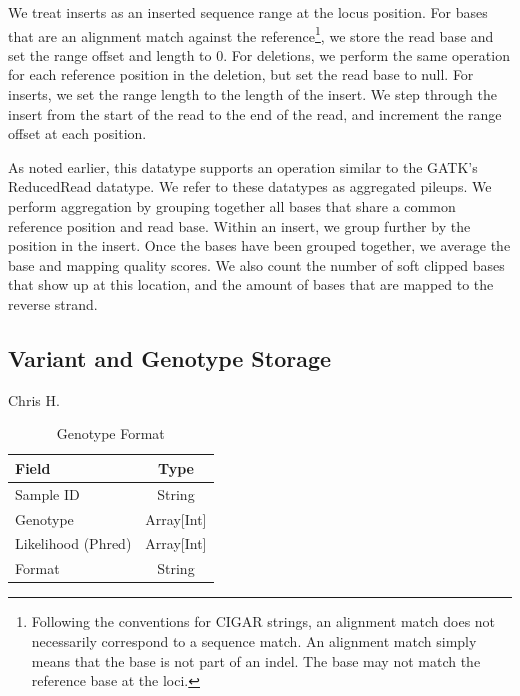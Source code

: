 \documentclass[10pt,twocolumn]{article}
\begin{document}
We treat inserts as an inserted sequence range at the locus position. For bases that are an alignment match against the
reference\footnote{Following the conventions for CIGAR strings, an alignment match does not necessarily correspond to
a sequence match. An alignment match simply means that the base is not part of an indel. The base may not match the
reference base at the loci.}, we store the read base and set the range offset and length to 0. For deletions, we perform the
same operation for each reference position in the deletion, but set the read base to null. For inserts, we set the range length
to the length of the insert. We step through the insert from the start of the read to the end of the read, and increment the
range offset at each position.

As noted earlier, this datatype supports an operation similar to the GATK's ReducedRead datatype. We refer to these datatypes
as aggregated pileups. We perform aggregation by grouping together all bases that share a common reference position and
read base. Within an insert, we group further by the position in the insert. Once the bases have been grouped together, we average
the base and mapping quality scores. We also count the number of soft clipped bases that show up at this location, and the amount
of bases that are mapped to the reverse strand.

\subsection{Variant and Genotype Storage}
\label{sec:variant-and-genotype-storage}

Chris H.

\begin{table}[h]
\caption{Genotype Format}
\label{tab:genotype-format}
\begin{center}
\begin{tabular}{| l | c |}
\hline
\bf Field & \bf Type \\
\hline
Sample ID & String \\
Genotype & Array[Int] \\
Likelihood (Phred) & Array[Int] \\
Format & String \\
\hline
\end{tabular}
\end{center}
\end{table}
\end{document}
